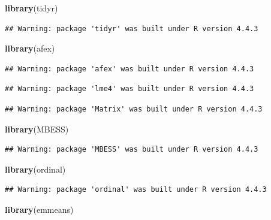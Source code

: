 \documentclass[
]{article}
\newenvironment{Shaded}{\begin{snugshade}}{\end{snugshade}}
\newcommand{\FunctionTok}[1]{\textcolor[rgb]{0.13,0.29,0.53}{\textbf{#1}}}
\newcommand{\NormalTok}[1]{#1}
\begin{document}
\begin{Shaded}
\begin{Highlighting}[]
\FunctionTok{library}\NormalTok{(tidyr)}
\end{Highlighting}
\end{Shaded}

\begin{verbatim}
## Warning: package 'tidyr' was built under R version 4.4.3
\end{verbatim}

\begin{Shaded}
\begin{Highlighting}[]
\FunctionTok{library}\NormalTok{(afex)}
\end{Highlighting}
\end{Shaded}

\begin{verbatim}
## Warning: package 'afex' was built under R version 4.4.3
\end{verbatim}

\begin{verbatim}
## Warning: package 'lme4' was built under R version 4.4.3
\end{verbatim}

\begin{verbatim}
## Warning: package 'Matrix' was built under R version 4.4.3
\end{verbatim}

\begin{Shaded}
\begin{Highlighting}[]
\FunctionTok{library}\NormalTok{(MBESS)}
\end{Highlighting}
\end{Shaded}

\begin{verbatim}
## Warning: package 'MBESS' was built under R version 4.4.3
\end{verbatim}

\begin{Shaded}
\begin{Highlighting}[]
\FunctionTok{library}\NormalTok{(ordinal)}
\end{Highlighting}
\end{Shaded}

\begin{verbatim}
## Warning: package 'ordinal' was built under R version 4.4.3
\end{verbatim}

\begin{Shaded}
\begin{Highlighting}[]
\FunctionTok{library}\NormalTok{(emmeans)}
\end{Highlighting}
\end{Shaded}
\end{document}
